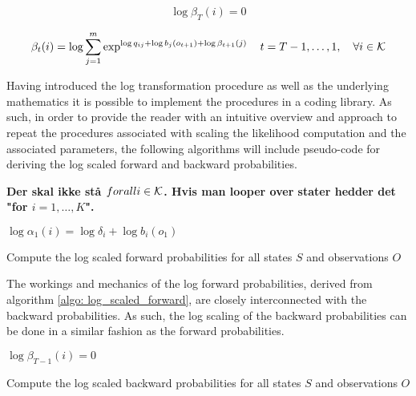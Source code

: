 \begin{equation}
     \log\beta_T(i) = 0
    \label{eq: log base backward}
\end{equation}

\begin{equation}
    \beta_t(i) = \log\sum_{j=1}^m \exp^{\log q_{ij}+\log b_j(o_{t+1})+\log \beta_{t+1}(j)}
    \quad t=T-1,\ldots,1, 
    \quad \forall i \in\operatorname{\mathcal{K}}
    \label{eq: log inductive backward}
\end{equation}

Having introduced the log transformation procedure as well as the underlying mathematics it is possible to implement the procedures in a coding library. As such, in order to provide the reader with an intuitive overview and approach to repeat the procedures associated with scaling the likelihood computation and the associated parameters, the following algorithms will include pseudo-code for deriving the log scaled forward and backward probabilities. 

\textbf{Der skal ikke stå $for all i \in \operatorname{\mathcal{K}}$. Hvis man looper over stater hedder det "for $i=1,\ldots,K$".}

\begin{algorithm}[H]

    {$\log\alpha_{1}(i) = \log\delta_i + \log b_i(o_1) $}  \;
        
\caption{Compute the log scaled forward probabilities for all states $S$ and observations $O$}
\label{algo: log_scaled_forward}
\end{algorithm}

The workings and mechanics of the log forward probabilities, derived from algorithm \ref{algo: log_scaled_forward}, are closely interconnected with the backward probabilities. As such, the log scaling of the backward probabilities can be done in a similar fashion as the forward probabilities.   

\begin{algorithm}[H]
{$\log \beta_{T-1}(i) = 0$} \;


\caption{Compute the log scaled backward probabilities for all states $S$ and observations $O$}
\label{algo: log_scaled_backward}
\end{algorithm}

